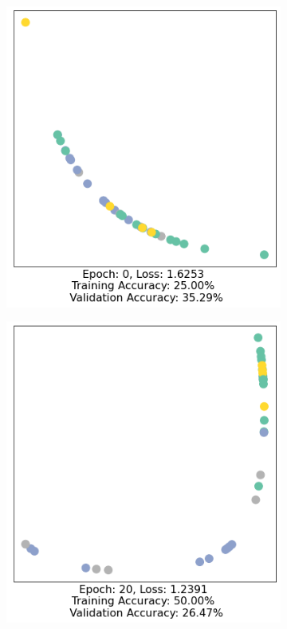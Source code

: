 \documentclass[12pt,a4paper]{report}
\theoremstyle{definition}
\begin{document}
\begin{figure}
    \centering
    \begin{subfigure}{.45 \textwidth}
        \centering
        \includegraphics[width=\textwidth]{Images/z_1.png}
    \end{subfigure}
    \hfill
    \begin{subfigure}[b!]{0.45\textwidth}
        \centering
        \includegraphics[width=\textwidth]{Images/z_3.png}

\end{subfigure}
\end{figure}
\end{document}
